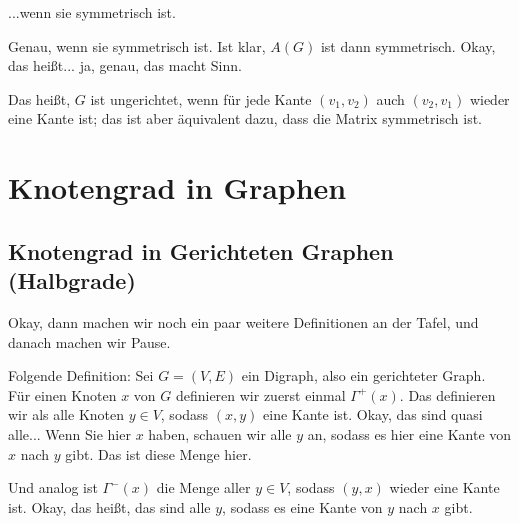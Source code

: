 \begin{student-interaction}[Studentenantwort]
...wenn sie symmetrisch ist.
\end{student-interaction}

\begin{spoken-clean}[00:41:27 - 00:41:30]
Genau, wenn sie symmetrisch ist. Ist klar, $A(G)$ ist dann symmetrisch. Okay, das heißt... ja, genau, das macht Sinn.

Das heißt, $G$ ist ungerichtet, wenn für jede Kante $(v_1, v_2)$ auch $(v_2, v_1)$ wieder eine Kante ist; das ist aber äquivalent dazu, dass die Matrix symmetrisch ist.
\end{spoken-clean}

\begin{math-stroke}
\end{math-stroke}

\section{Knotengrad in Graphen}

\subsection{Knotengrad in Gerichteten Graphen (Halbgrade)}

\begin{spoken-clean}[00:41:30 - 00:43:00]
Okay, dann machen wir noch ein paar weitere Definitionen an der Tafel, und danach machen wir Pause.

Folgende Definition: Sei $G = (V, E)$ ein Digraph, also ein gerichteter Graph. Für einen Knoten $x$ von $G$ definieren wir zuerst einmal $\Gamma^+(x)$. Das definieren wir als alle Knoten $y \in V$, sodass $(x, y)$ eine Kante ist. Okay, das sind quasi alle... Wenn Sie hier $x$ haben, schauen wir alle $y$ an, sodass es hier eine Kante von $x$ nach $y$ gibt. Das ist diese Menge hier.

Und analog ist $\Gamma^-(x)$ die Menge aller $y \in V$, sodass $(y, x)$ wieder eine Kante ist. Okay, das heißt, das sind alle $y$, sodass es eine Kante von $y$ nach $x$ gibt.
\end{spoken-clean}

